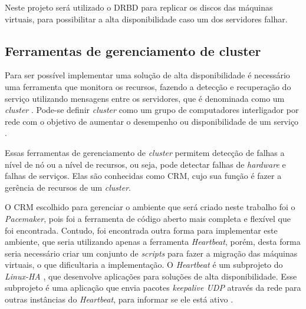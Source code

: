 Neste projeto será utilizado o \ac{DRBD} para replicar os discos das máquinas virtuais, para possibilitar a alta disponibilidade caso um 
dos servidores falhar.


\subsection{Ferramentas de gerenciamento de cluster}
\label{section:toolcluster}

Para ser possível implementar uma solução de alta disponibilidade é necessário uma ferramenta que monitora os recursos, fazendo a detecção e
recuperação do serviço utilizando mensagens entre os servidores, que é denominada como um \textit{cluster} \cite{perkov2011}. 
Pode-se definir \textit{cluster} como um grupo de computadores interligador por rede com o objetivo de aumentar o desempenho ou disponibilidade
de um serviço \cite{freitas2005}.

Essas ferramentas de gerenciamento de \textit{cluster} permitem detecção de falhas a nível de nó ou a nível de recursos, ou seja, pode detectar
falhas de \textit{hardware} e falhas de serviços.
Elas são conhecidas como \ac{CRM}, cujo sua função é fazer a gerência de recursos de um \textit{cluster}.

O \ac{CRM} escolhido para gerenciar o ambiente que será criado neste trabalho foi o \textit{Pacemaker}, pois foi a ferramenta de código aberto
mais completa e flexível que foi encontrada. Contudo, foi encontrada outra forma para implementar este ambiente, que seria utilizando apenas a 
ferramenta \textit{Heartbeat}, porém, desta forma seria necessário criar um conjunto de \textit{scripts} para fazer a migração das máquinas 
virtuais, o que dificultaria a implementação.
O \textit{Heartbeat} é um subprojeto do \textit{Linux-HA} \cite{linuxha}, que desenvolve aplicações para soluções de alta disponibilidade.
Esse subprojeto é uma aplicação que envia pacotes \textit{keepalive \ac{UDP}} através da rede para outras instâncias do \textit{Heartbeat}, para
informar se ele está ativo \cite{reis2009}.

